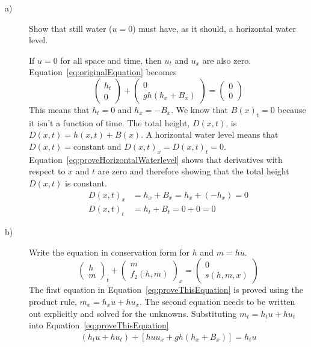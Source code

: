 \begin{description}
	\item[a)] Show that still water ($u=0$) must have, as it should, a horizontal water level. 
	
	If $u=0$ for all space and time, then $u_t$ and $u_x$ are also zero. Equation~\eqref{eq:originalEquation} becomes 
	\begin{equation}
		\begin{pmatrix}
			h_t\\0 
		\end{pmatrix}
		+ 
		\begin{pmatrix}
			0\\gh( h_x + B_x ) 
		\end{pmatrix}
		= 
		\begin{pmatrix}
			0\\0 
		\end{pmatrix}
		\label{eq:equationIfUiszero} 
	\end{equation}
	This means that $h_t=0$ and $h_x=-B_x$. We know that $B(x)_t=0$ because it isn't a function of time. The total height, $D(x,t)$, is $D(x,t) = h(x,t) + B(x)$. A horizontal water level means that $D(x,t) = \text{constant}$ and $D(x,t)_x=D(x,t)_t=0$. Equation~\eqref{eq:proveHorizontalWaterlevel} shows that derivatives with respect to $x$ and $t$ are zero and therefore showing that the total height $D(x,t)$ is constant. 
	\begin{align}
		D(x,t)_x &= h_x + B_x = h_x + (-h_x) = 0\\
		D(x,t)_t &= h_t + B_t = 0 + 0 = 0 \label{eq:proveHorizontalWaterlevel} 
	\end{align}
	
	\item[b)] Write the equation in conservation form for $h$ and $m=hu$. 
	\begin{equation}
		\begin{pmatrix}
			h\\m 
		\end{pmatrix}
		_t + 
		\begin{pmatrix}
			m\\f_2(h,m) 
		\end{pmatrix}
		_x = 
		\begin{pmatrix}
			0\\s(h,m,x) 
		\end{pmatrix}
		\label{eq:proveThisEquation} 
	\end{equation} %
	The first equation in Equation~\eqref{eq:proveThisEquation} is proved using the product rule, $m_x = h_x u + h u_x$. The second equation needs to be written out explicitly and solved for the unknowns. Substituting $m_t = h_t u + h u_t$ into Equation~\eqref{eq:proveThisEquation} 
	\begin{align}
		(h_t u + h u_t) + [h u u_x + gh( h_x + B_x )] = h_t u  \label{eq:firstToConservation} 
	\end{align}
	

\end{description}
